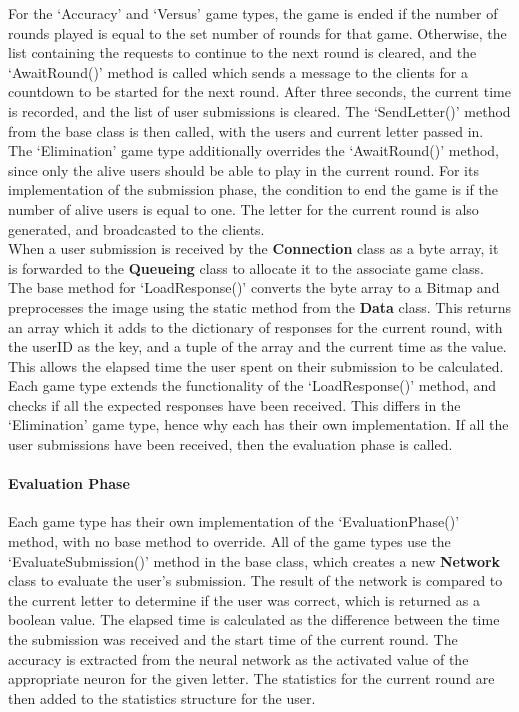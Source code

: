 \documentclass{article}
\begin{document}
For the `Accuracy' and `Versus' game types, the game is ended if the number of rounds played is equal to the set number of rounds for that game. Otherwise, the list containing the requests to continue to the next round is cleared, and the `AwaitRound()' method is called which sends a message to the clients for a countdown to be started for the next round. After three seconds, the current time is recorded, and the list of user submissions is cleared. The `SendLetter()' method from the base class is then called, with the users and current letter passed in. \\

The `Elimination' game type additionally overrides the `AwaitRound()' method, since only the alive users should be able to play in the current round. For its implementation of the submission phase, the condition to end the game is if the number of alive users is equal to one. The letter for the current round is also generated, and broadcasted to the clients. \\

When a user submission is received by the \textbf{Connection} class as a byte array, it is forwarded to the \textbf{Queueing} class to allocate it to the associate game class. The base method for `LoadResponse()' converts the byte array to a Bitmap and preprocesses the image using the static method from the \textbf{Data} class. This returns an array which it adds to the dictionary of responses for the current round, with the userID as the key, and a tuple of the array and the current time as the value. This allows the elapsed time the user spent on their submission to be calculated. \\

Each game type extends the functionality of the `LoadResponse()' method, and checks if all the expected responses have been received. This differs in the `Elimination' game type, hence why each has their own implementation. If all the user submissions have been received, then the evaluation phase is called.

\paragraph{Evaluation Phase\\}

Each game type has their own implementation of the `EvaluationPhase()' method, with no base method to override. All of the game types use the `EvaluateSubmission()' method in the base class, which creates a new \textbf{Network} class to evaluate the user's submission. The result of the network is compared to the current letter to determine if the user was correct, which is returned as a boolean value. The elapsed time is calculated as the difference between the time the submission was received and the start time of the current round. The accuracy is extracted from the neural network as the activated value of the appropriate neuron for the given letter. The statistics for the current round are then added to the statistics structure for the user. \\
\end{document}
